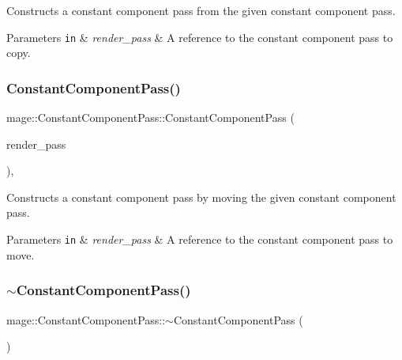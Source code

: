 Constructs a constant component pass from the given constant component pass.


\begin{DoxyParams}[1]{Parameters}
\mbox{\tt in}  & {\em render\+\_\+pass} & A reference to the constant component pass to copy. \\
\hline
\end{DoxyParams}
\hypertarget{classmage_1_1_constant_component_pass_a740def3e95651180a7f2392a922e0706}{}\label{classmage_1_1_constant_component_pass_a740def3e95651180a7f2392a922e0706} 
\subsubsection{\texorpdfstring{Constant\+Component\+Pass()}{ConstantComponentPass()}\hspace{0.1cm}{\footnotesize\ttfamily [3/3]}}
{\footnotesize\ttfamily mage\+::\+Constant\+Component\+Pass\+::\+Constant\+Component\+Pass (\begin{DoxyParamCaption}\item[{\hyperlink{classmage_1_1_constant_component_pass}{Constant\+Component\+Pass} \&\&}]{render\+\_\+pass }\end{DoxyParamCaption})\hspace{0.3cm}{\ttfamily [default]}, {\ttfamily [noexcept]}}

Constructs a constant component pass by moving the given constant component pass.


\begin{DoxyParams}[1]{Parameters}
\mbox{\tt in}  & {\em render\+\_\+pass} & A reference to the constant component pass to move. \\
\hline
\end{DoxyParams}
\hypertarget{classmage_1_1_constant_component_pass_aaa94607b422672dab4cb77f129382d1b}{}\label{classmage_1_1_constant_component_pass_aaa94607b422672dab4cb77f129382d1b} 
\subsubsection{\texorpdfstring{$\sim$\+Constant\+Component\+Pass()}{~ConstantComponentPass()}}
{\footnotesize\ttfamily mage\+::\+Constant\+Component\+Pass\+::$\sim$\+Constant\+Component\+Pass (\begin{DoxyParamCaption}{ }\end{DoxyParamCaption})\hspace{0.3cm}{\ttfamily [default]}}

